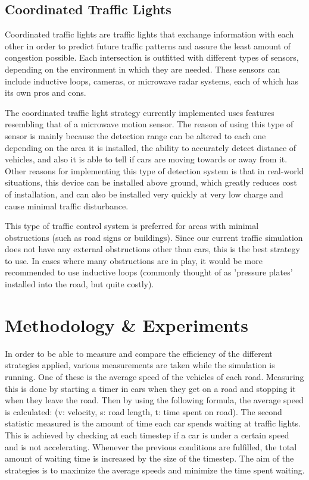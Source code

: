 \documentclass[10pt]{article}
\begin{document}
\subsection{Coordinated Traffic Lights}
Coordinated traffic lights are traffic lights that exchange information with each other in order to predict future traffic patterns and assure the least amount of congestion possible.  Each intersection is outfitted with different types of sensors, depending on the environment in which they are needed.  These sensors can include inductive loops, cameras, or microwave radar systems, each of which has its own pros and cons.

The coordinated traffic light strategy currently implemented uses features resembling that of a microwave motion sensor.  The reason of using this type of sensor is mainly because the detection range can be altered to each one depending on the area it is installed, the ability to accurately detect distance of vehicles, and also it is able to tell if cars are moving towards or away from it.  Other reasons for implementing this type of detection system is that in real-world situations, this device can be installed above ground, which greatly reduces cost of installation, and can also be installed very quickly at very low charge and cause minimal traffic disturbance.

This type of traffic control system is preferred for areas with minimal obstructions (such as road signs or buildings).  Since our current traffic simulation does not have any external obstructions other than cars, this is the best strategy to use.  In cases where many obstructions are in play, it would be more recommended to use inductive loops (commonly thought of as 'pressure plates' installed into the road, but quite costly).

\section{Methodology \& Experiments}
\label{sec:experiments}

In order to be able to measure and compare the efficiency of the different strategies applied, various measurements are taken while the simulation is running. One of these is the average speed of the vehicles of each road. Measuring this is done by starting a timer in cars when they get on a road and stopping it when they leave the road. Then by using the following formula, the average speed is calculated:   (v: velocity, s: road length, t: time spent on road). The second statistic measured is the amount of time each car spends waiting at traffic lights. This is achieved by checking at each timestep if a car is under a certain speed and is not accelerating. Whenever the previous conditions are fulfilled, the total amount of waiting time is increased by the size of the timestep. The aim of the strategies is to maximize the average speeds and minimize the time spent waiting.
\end{document}
